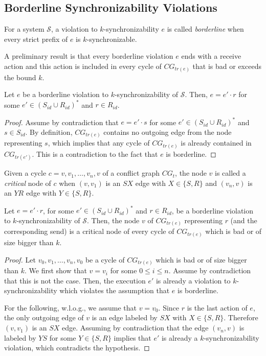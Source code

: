 \subsection{Borderline Synchronizability Violations}

For a system $\mathcal{S}$, a violation to $k$-synchronizability $e$ is called \emph{borderline} when every strict prefix of 
$e$ is $k$-synchronizable.

A preliminary result is that every borderline violation $e$ ends with a receive action and this action is included in every cycle of $CG_{tr(e)}$ that is 
bad or exceeds the bound $k$. 

\begin{lemma}
Let $e$ be a borderline violation to $k$-synchronizability of $\mathcal{S}$. Then, $e = e'\cdot r$ for some $e'\in (S_{id}\cup R_{id})^*$ and $r\in R_{id}$.
\end{lemma}
\begin{proof}
Assume by contradiction that $e=e'\cdot s$ for some $e'\in (S_{id}\cup R_{id})^*$ and $s\in S_{id}$. By definition, $CG_{tr(e)}$ contains no outgoing
edge from the node representing $s$, which implies that any cycle of $CG_{tr(e)}$ is already contained in $CG_{tr(e')}$. This is a contradiction to 
the fact that $e$ is borderline.
\end{proof}

Given a cycle $c = v,v_1,\ldots,v_n,v$ of a conflict graph $CG_t$, the node $v$ is called a \emph{critical} node of $c$ when $(v,v_1)$ is an $SX$ edge with $X\in \{S,R\}$ 
and $(v_n,v)$ is an $YR$ edge with $Y\in \{S,R\}$.

\begin{lemma}
Let $e = e'\cdot r$, for some $e'\in (S_{id}\cup R_{id})^*$ and $r\in R_{id}$, be a borderline violation to $k$-synchronizability of $\mathcal{S}$. 
Then, the node $v$ of $CG_{tr(e)}$ representing $r$ (and the corresponding send) is a critical node of every cycle of 
$CG_{tr(e)}$ which is bad or of size bigger than $k$. %
\end{lemma}
\begin{proof}
Let $v_0,v_1,\ldots,v_n,v_0$ be a cycle of $CG_{tr(e)}$ which is bad or of size bigger than $k$. We first show that $v=v_i$ for some $0\leq i\leq n$. 
Assume by contradiction that this is not the case. Then, the execution $e'$ is already a violation to $k$-synchronizability which violates the assumption that $e$ is borderline.

For the following, w.l.o.g., we assume that $v=v_0$. Since $r$ is the last action of $e$, the only outgoing edge of $v$ is an edge labeled by $SX$ with $X\in \{S,R\}$. Therefore $(v,v_1)$ is an $SX$ edge. 
Assuming by contradiction that the edge $(v_n,v)$ is labeled by $YS$ for some $Y\in \{S,R\}$ implies that $e'$ is already a $k$-synchronizability violation, which contradicts the hypothesis.
\end{proof}


